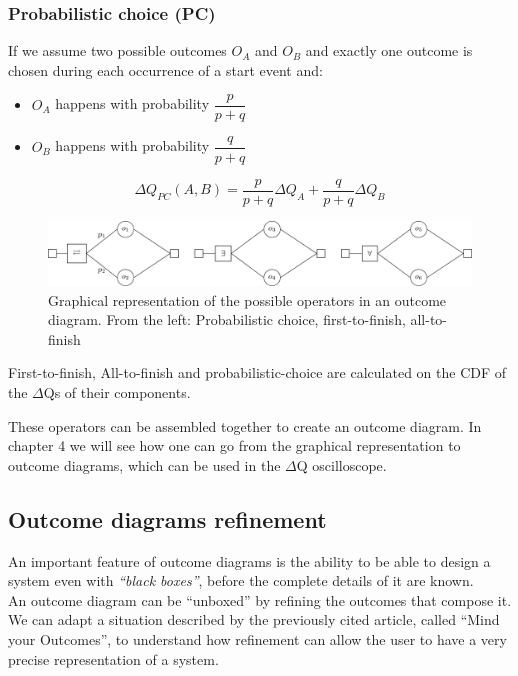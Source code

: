     \subsubsection{Probabilistic choice (PC)}
        If we assume two possible outcomes $O_A$ and $O_B$ and exactly one outcome is chosen during each occurrence of a start event and:
        \begin{itemize}
            \item $O_A$ happens with probability $\dfrac{p}{p+q}$
            \item $O_B$ happens with probability $\dfrac{q}{p + q}$
        \end{itemize}
        \begin{equation}
           \Delta Q_{PC}(A, B) = \dfrac{p}{p + q}\Delta Q_A + \dfrac{q}{p + q}\Delta Q_B 
            \label{eq:pc}
        \end{equation} 

    \begin{figure}[H]
        \begin{center}
            \includegraphics[width = \textwidth]{tikz/op.pdf}
        \end{center}
        \caption{Graphical representation of the possible operators in an outcome diagram. From the left: Probabilistic choice, first-to-finish, all-to-finish \cite{myo}}
        \label{fig:op}
    \end{figure}
    First-to-finish, All-to-finish and probabilistic-choice are calculated on the CDF of the $\Delta$Qs of their components.
    
    These operators can be assembled together to create an outcome diagram. In chapter 4 we will see how one can go from the graphical representation to outcome diagrams, which can be used in the $\Delta$Q oscilloscope.
    
    \subsection{Outcome diagrams refinement}
        An important feature of outcome diagrams is the ability to be able to design a system even with \textit{``black boxes''}, before the complete details of it are known. \cite{myo} \\
        An outcome diagram can be ``unboxed'' by refining the outcomes that compose it. We can adapt a situation described by the previously cited article, called ``Mind your Outcomes'', to understand how refinement can allow the user to have a very precise representation of a system. 
        
